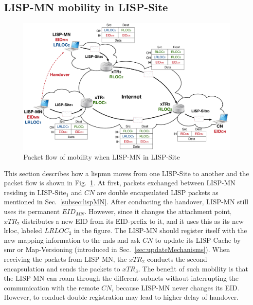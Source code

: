 \subsection{LISP-MN mobility in LISP-Site}
\label{subsec:lispMN_LS}

\begin{figure}[!t]
	\centering
	\includegraphics[width=\textwidth]{Pics/LISP-MN_in_LISP-Site.eps}
	\caption{Packet flow of mobility when LISP-MN in LISP-Site}
	\label{LISP-MN_in_LISP-Site}
\end{figure}

This section describes how a \acrshort{lispmn} moves from one LISP-Site to another and the packet flow is shown in Fig.~\ref{LISP-MN_in_LISP-Site}. At first, packets exchanged between $\text{LISP-MN}$ residing in $\text{LISP-Site}_1$ and $CN$ are double encapsulated LISP packets as mentioned in Sec.~\ref{subsec:lispMN}. After conducting the handover, $\text{LISP-MN}$ still uses its permanent $EID_{MN}$. However, since it changes the attachment point, $xTR_2$ distributes a new EID from its EID-prefix to it, and it uses this as its new \acrshort{lrloc}, labeled $LRLOC_2$ in the figure. The $\text{LISP-MN}$ should register itself with the new mapping information to the \acrshort{mds} and ask $CN$ to update its LISP-Cache by \acrshort{smr} or Map-Versioning (introduced in Sec.~\ref{sec:updateMechanisms}). When receiving the packets from $\text{LISP-MN}$, the $xTR_2$ conducts the second encapsulation and sends the packets to $xTR_3$. The benefit of such mobility is that the $\text{LISP-MN}$ can roam through the different subnets without interrupting the communication with the remote $CN$, because $\text{LISP-MN}$ never changes its EID. However, to conduct double registration may lead to higher delay of handover.


